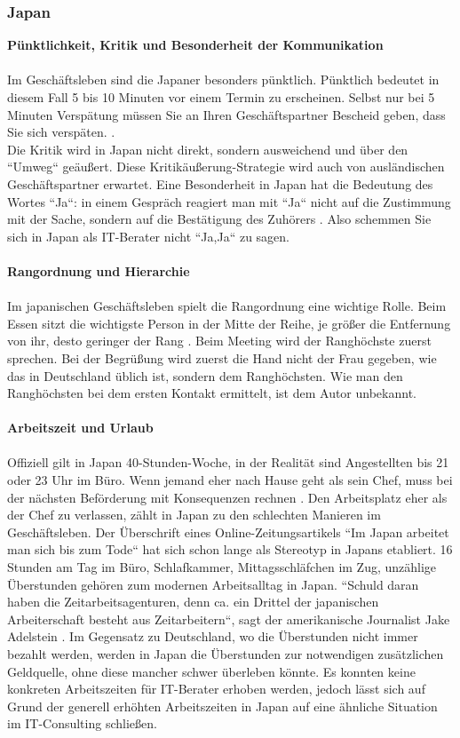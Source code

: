 	\subsubsection{Japan}
	\textbf{Pünktlichkeit, Kritik und Besonderheit der Kommunikation}\\
	\\
	Im Geschäftsleben sind die Japaner besonders pünktlich. Pünktlich bedeutet in diesem Fall 5 bis 10 Minuten vor einem Termin zu erscheinen. Selbst nur bei 5 Minuten Verspätung müssen Sie an Ihren Geschäftspartner Bescheid geben, dass Sie sich verspäten. \cite{KastensystemInd}. \\
	Die Kritik wird in Japan nicht direkt, sondern ausweichend und über den ``Umweg`` geäußert. Diese Kritikäußerung-Strategie wird auch von ausländischen Geschäftspartner erwartet. Eine Besonderheit in Japan hat die Bedeutung des Wortes ``Ja``: in einem Gespräch reagiert man mit ``Ja`` nicht auf die Zustimmung mit der Sache, sondern auf die Bestätigung des Zuhörers \cite{JPKnigge}. Also schemmen Sie sich in Japan als IT-Berater nicht  ``Ja,Ja`` zu sagen.\\
	\\
	\textbf{Rangordnung und Hierarchie}\\
	\\
	Im japanischen Geschäftsleben spielt die Rangordnung eine wichtige Rolle.
	Beim Essen sitzt die wichtigste Person in der Mitte der Reihe, je größer die Entfernung von ihr, desto geringer der Rang \cite{Business-KniggeFernost}.	
	Beim Meeting wird der Ranghöchste zuerst sprechen. Bei der Begrüßung wird zuerst die Hand nicht der Frau gegeben, wie das in Deutschland üblich ist, sondern dem Ranghöchsten. Wie man den Ranghöchsten bei dem ersten Kontakt ermittelt, ist dem Autor unbekannt.\\
	\\
	\textbf{Arbeitszeit und Urlaub}\\
	\\
	Offiziell gilt in Japan 40-Stunden-Woche, in der Realität sind Angestellten bis 21 oder 23 Uhr im Büro. Wenn jemand eher nach Hause geht als sein Chef, muss bei der nächsten Beförderung mit Konsequenzen rechnen \cite{ArbZeitJP}. Den Arbeitsplatz eher als der Chef zu verlassen, zählt in Japan zu den schlechten Manieren im Geschäftsleben.
	Der Überschrift eines Online-Zeitungsartikels ``Im Japan arbeitet man sich bis zum Tode`` hat sich schon lange als Stereotyp in Japans etabliert. 
	16 Stunden am Tag im Büro, Schlafkammer, Mittagsschläfchen im Zug, unzählige Überstunden gehören zum modernen Arbeitsalltag in Japan. ``Schuld daran haben die Zeitarbeitsagenturen, denn ca. ein Drittel der japanischen Arbeiterschaft besteht aus Zeitarbeitern``, sagt der amerikanische Journalist Jake Adelstein \cite{JPArbeit}. Im Gegensatz zu Deutschland, wo die Überstunden nicht immer bezahlt werden, werden in Japan die Überstunden zur  notwendigen zusätzlichen Geldquelle, ohne diese mancher schwer überleben könnte.
	Es konnten keine konkreten Arbeitszeiten für IT-Berater erhoben werden, jedoch lässt sich auf  Grund der generell erhöhten Arbeitszeiten in Japan auf eine ähnliche Situation im IT-Consulting schließen. 

